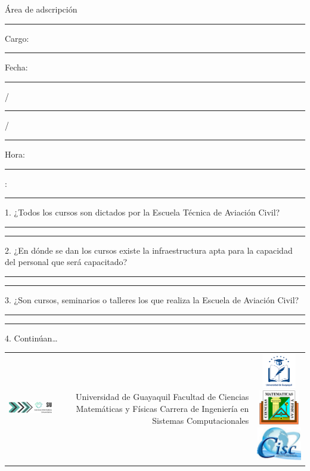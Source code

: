 \documentclass[12pt, a4paper, nofontenc, numbers=endperiod]{apa7}
\begin{document}
{\setlength{\parindent}{0cm}Área de adscripción \\
\rule[0mm]{160mm}{0.1mm}	

\setlength{\parindent}{0cm}Cargo:\rule[0mm]{100mm}{0.1mm}Fecha:\rule[0mm]{5mm}{0.1mm}/\rule[0mm]{5mm}{0.1mm}/\rule[0mm]{5mm}{0.1mm}Hora:\rule[0mm]{5mm}{0.1mm}:\rule[0mm]{5mm}{0.1mm}

\setlength{\parindent}{1.27cm}1. ¿Todos los cursos son dictados por la Escuela Técnica de Aviación Civil?\\
\rule[0mm]{160mm}{0.1mm}
\rule[0mm]{160mm}{0.1mm}

\setlength{\parindent}{1.27cm}2. ¿En dónde se dan los cursos existe la infraestructura apta para la capacidad del personal que será capacitado? \\
\rule[0mm]{160mm}{0.1mm}
\rule[0mm]{160mm}{0.1mm}

\setlength{\parindent}{1.27cm}3. ¿Son cursos, seminarios o talleres los que realiza la Escuela de Aviación Civil?\\
\rule[0mm]{160mm}{0.1mm}
\rule[0mm]{160mm}{0.1mm}

\setlength{\parindent}{1.27cm}4. Continúan…


\newpage


{\singlespacing \footnotesize
	\begin{turn}{90}
		\renewcommand{\multirowsetup}{\centering}	{\renewcommand{\arraystretch}{1.4}
			\begin{tabular}{|p{5cm}|r|r|r|r|} 
				
				\multicolumn{1}{p{6cm}}{ \vspace*{0.1cm}\includegraphics[width=6cm,height=1.5cm]{Imagenes/Figura36}} &\multicolumn{3}{p{9.1cm}}{\vspace{0.1mm} Universidad de Guayaquil \newline Facultad de Ciencias Matemáticas y Físicas \newline
					Carrera de Ingeniería en Sistemas Computacionales}
				& 
				\multicolumn{1}{p{4cm}}{\vspace{3mm}\includegraphics[width=2cm,height=1.5cm]{Imagenes/Figura1}\hspace*{0.5cm}\includegraphics[width=2cm,height=1.5cm]{Imagenes/Figura14}\hspace*{0.5cm}\includegraphics[width=2cm,height=1.5cm]{Imagenes/Figura15}}
				\\
				

\end{tabular}}
\end{turn}}}
\end{document}
